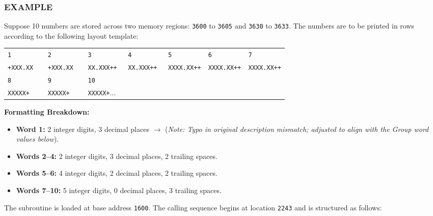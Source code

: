 \subsubsection*{EXAMPLE}
Suppose 10 numbers are stored across two memory regions: \texttt{3600} to \texttt{3605} and \texttt{3630} to \texttt{3633}. The numbers are to be printed in rows according to the following layout template:
\begin{center}
\footnotesize
\begin{tabular}{l}
\texttt{1\ \ \ \ \ \ \ \ \ \ 2\ \ \ \ \ \ \ \ \ \ 3\ \ \ \ \ \ \ \ \ \ 4\ \ \ \ \ \ \ \ \ \ 5\ \ \ \ \ \ \ \ \ \ 6\ \ \ \ \ \ \ \ \ \ 7} \\
\texttt{+XXX.XX\ \ \ \ +XXX.XX\ \ \ \ XX.XXX++\ \ \ XX.XXX++\ \ \ XXXX.XX++\ \ XXXX.XX++\ \ XXXX.XX++} \\
\texttt{8\ \ \ \ \ \ \ \ \ \ 9\ \ \ \ \ \ \ \ \ \ 10} \\
\texttt{XXXXX+\ \ \ \ \ XXXXX+\ \ \ \ \ XXXXX+$\dots$} \\

\end{tabular}
\end{center}

\textbf{Formatting Breakdown:}
\begin{itemize}
    \item \textbf{Word 1:} 2 integer digits, 3 decimal places $\rightarrow$ (\textit{Note: Typo in original description mismatch; adjusted to align with the Group word values below}).
    \item \textbf{Words 2--4:} 2 integer digits, 3 decimal places, 2 trailing spaces.
    \item \textbf{Words 5--6:} 4 integer digits, 2 decimal places, 2 trailing spaces.
    \item \textbf{Words 7--10:} 5 integer digits, 0 decimal places, 3 trailing spaces.
\end{itemize}

The subroutine is loaded at base address \texttt{1600}. The calling sequence begins at location \texttt{2243} and is structured as follows:

